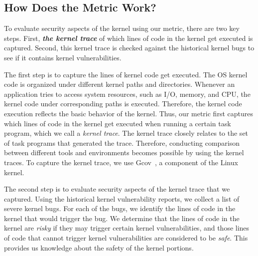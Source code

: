 \subsection{How Does the Metric Work?}
To evaluate security aspects of the kernel using our metric, there are two key steps. First, 
\textbf{\textit{the kernel trace}} of which lines of code in the kernel get executed is captured. 
Second, this kernel trace is checked against the historical kernel bugs to see if it contains kernel vulnerabilities. 

The first step is to capture the lines of kernel code get executed. 
The OS kernel code is organized under different kernel paths and directories. 
Whenever an application tries to access system resources, such as I/O, memory, and CPU, the kernel code 
under corresponding paths is executed. Therefore, the kernel code execution 
reflects the basic behavior of the kernel. 
Thus, %
our metric %
first captures which lines of code in the kernel get executed 
when running a certain task program, which we call a \textit{kernel trace}. The kernel trace closely
relates to the set of task programs that generated the trace. Therefore, conducting comparison between 
different tools and environments 
becomes possible by using the kernel traces. To capture the kernel trace, 
we use Gcov~\cite{gcov}, a component of the Linux kernel.

The second step is to evaluate security aspects of the kernel trace that we captured. Using the historical kernel vulnerability 
reports, we collect a list of severe kernel bugs. 
For each of the bugs, we identify the lines of code 
in the kernel that would trigger the bug.  We determine that the lines of code in the kernel are \textit{risky} if they 
may trigger certain kernel vulnerabilities, and those lines of code that cannot trigger kernel vulnerabilities are 
considered to be \textit{safe}. This provides us knowledge about the safety of the kernel portions.

